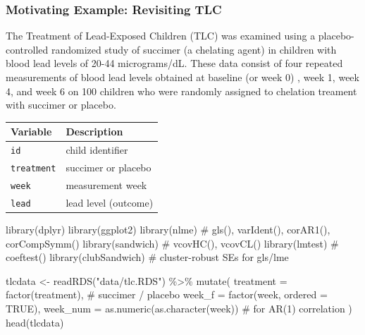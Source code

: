 \documentclass[
  letterpaper,
  DIV=11,
  numbers=noendperiod]{scrreprt}
\newenvironment{Shaded}{\begin{snugshade}}{\end{snugshade}}
\newcommand{\AttributeTok}[1]{\textcolor[rgb]{0.40,0.45,0.13}{#1}}
\newcommand{\CommentTok}[1]{\textcolor[rgb]{0.37,0.37,0.37}{#1}}
\newcommand{\ConstantTok}[1]{\textcolor[rgb]{0.56,0.35,0.01}{#1}}
\newcommand{\FunctionTok}[1]{\textcolor[rgb]{0.28,0.35,0.67}{#1}}
\newcommand{\NormalTok}[1]{\textcolor[rgb]{0.00,0.23,0.31}{#1}}
\newcommand{\OtherTok}[1]{\textcolor[rgb]{0.00,0.23,0.31}{#1}}
\newcommand{\SpecialCharTok}[1]{\textcolor[rgb]{0.37,0.37,0.37}{#1}}
\newcommand{\StringTok}[1]{\textcolor[rgb]{0.13,0.47,0.30}{#1}}
\begin{document}
\hypertarget{motivating-example-revisiting-tlc}{%
\subsubsection*{Motivating Example: Revisiting
TLC}\label{motivating-example-revisiting-tlc}}

The Treatment of Lead-Exposed Children (TLC) was examined using a
placebo-controlled randomized study of succimer (a chelating agent) in
children with blood lead levels of 20-44 micrograms/dL. These data
consist of four repeated measurements of blood lead levels obtained at
baseline (or week 0) , week 1, week 4, and week 6 on 100 children who
were randomly assigned to chelation treament with succimer or placebo.

\begin{longtable}[]{@{}ll@{}}
\toprule\noalign{}
Variable & Description \\
\midrule\noalign{}
\endhead
\bottomrule\noalign{}
\endlastfoot
\texttt{id} & child identifier \\
\texttt{treatment} & succimer or placebo \\
\texttt{week} & measurement week \\
\texttt{lead} & lead level (outcome) \\
\end{longtable}

\begin{Shaded}
\begin{Highlighting}[]
\FunctionTok{library}\NormalTok{(dplyr)}
\FunctionTok{library}\NormalTok{(ggplot2)}
\FunctionTok{library}\NormalTok{(nlme)        }\CommentTok{\# gls(), varIdent(), corAR1(), corCompSymm()}
\FunctionTok{library}\NormalTok{(sandwich)    }\CommentTok{\# vcovHC(), vcovCL()}
\FunctionTok{library}\NormalTok{(lmtest)      }\CommentTok{\# coeftest()}
\FunctionTok{library}\NormalTok{(clubSandwich) }\CommentTok{\# cluster{-}robust SEs for gls/lme}

\NormalTok{tlcdata }\OtherTok{\textless{}{-}} \FunctionTok{readRDS}\NormalTok{(}\StringTok{"data/tlc.RDS"}\NormalTok{) }\SpecialCharTok{\%\textgreater{}\%}
  \FunctionTok{mutate}\NormalTok{(}
    \AttributeTok{treatment =} \FunctionTok{factor}\NormalTok{(treatment),          }\CommentTok{\# succimer / placebo}
    \AttributeTok{week\_f    =} \FunctionTok{factor}\NormalTok{(week, }\AttributeTok{ordered =} \ConstantTok{TRUE}\NormalTok{),}
    \AttributeTok{week\_num  =} \FunctionTok{as.numeric}\NormalTok{(}\FunctionTok{as.character}\NormalTok{(week)) }\CommentTok{\# for AR(1) correlation}
\NormalTok{  )}
\FunctionTok{head}\NormalTok{(tlcdata)}
\end{Highlighting}
\end{Shaded}
\end{document}
